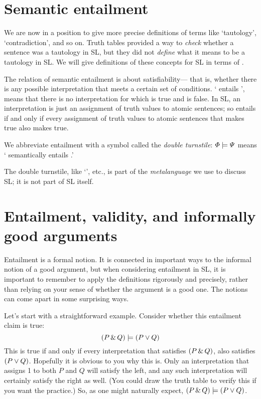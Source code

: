 \section{Semantic entailment}

We are now in a position to give more precise definitions of terms like `tautology', `contradiction', and so on. Truth tables provided a way to \emph{check} whether a sentence was a tautology in SL, but they did not \emph{define} what it means to be a tautology in SL. We will give definitions of these concepts for SL in terms of .

The relation of semantic entailment is about satisfiability--- that is, whether there is any possible interpretation that meets a certain set of conditions. `\metaA{} entails \metaB{}', means that there is no interpretation for which \metaA{} is true and \metaB{} is false. In SL, an interpretation is just an assignment of truth values to atomic sentences; so \metaA{} entails \metaB{} if and only if every assignment of truth values to atomic sentences that makes \metaA{} true also makes \metaB{} true.

We abbreviate entailment with a symbol called the \emph{double turnstile}:
$\varPhi{}\models\varPsi{}$ means `\metaA{} semantically entails \metaB{}.'

The double turnstile, like `\metaA{}', etc., is part of the \emph{metalanguage} we use to discuss SL; it is not part of SL itself.

\section{Entailment, validity, and informally good arguments}

Entailment is a formal notion. It is connected in important ways to the informal notion of a good argument, but when considering entailment in SL, it is important to remember to apply the definitions rigorously and precisely, rather than relying on your sense of whether the argument is a good one. The notions can come apart in some surprising ways.

Let's start with a straightforward example. Consider whether this entailment claim is true: $$(P\,\&\, Q) \models (P\vee Q)$$ This is true if and only if every interpretation that satisfies $(P\,\&\, Q)$, also satisfies  $(P\vee Q)$. Hopefully it is obvious to you why this is. Only an interpretation that assigns 1 to both $P$ and $Q$ will satisfy the left, and any such interpretation will certainly satisfy the right as well. (You could draw the truth table to verify this if you want the practice.) So, as one might naturally expect, $(P\,\&\, Q) \models (P\vee Q)$.

